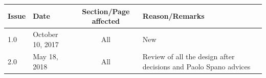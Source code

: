 
\newpage

\begin{center}
\begin{tabular}{llcl}
Issue & Date & Section/Page affected & Reason/Remarks \\ \hline
1.0 & October 10, 2017 & All & New \\ \hline
2.0 & May 18, 2018 & All & Review of all the design after decisions and Paolo Spano advices \\ \hline
\end{tabular}
\end{center}
\newpage
